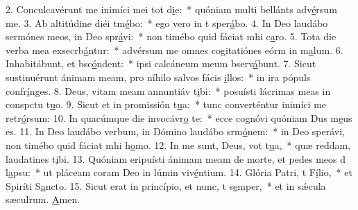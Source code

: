2. Conculcavérunt me inimíci mei tot d\uline{i}e:~* quóniam multi bellánts adv\uline{é}rsum me.
3. Ab altitúdine diéi tm\uline{é}bo:~* ego vero in t sper\uline{á}bo.
4. In Deo laudábo sermónes meos, in Deo spr\uline{á}vi:~* non timébo quid fáciat mhi c\uline{a}ro.
5. Tota die verba mea exsecrb\uline{á}ntur:~* advérsum me omnes cogitatiónes eórm in m\uline{a}lum.
6. Inhabitábunt, et bsc\uline{ó}ndent:~* ipsi calcáneum meum bserv\uline{á}bunt.
7. Sicut sustinuérunt ánimam meam, pro níhilo salvos fácis \uline{i}llos:~* in ira pópuls confr\uline{í}nges.
8. Deus, vitam meam annuntiáv t\uline{i}bi:~* posuísti lácrimas meas in conspctu t\uline{u}o.
9. Sicut et in promissión t\uline{u}a:~* tunc converténtur inimíci me retr\uline{ó}rsum:
10. In quacúmque die invocávr\uline{o} te:~* ecce cognóvi quóniam Dus m\uline{e}us es.
11. In Deo laudábo verbum, in Dómino laudábo srm\uline{ó}nem:~* in Deo sperávi, non timébo quid fáciat mhi h\uline{o}mo.
12. In me sunt, Deus, vot t\uline{u}a,~* quæ reddam, laudatines t\uline{i}bi.
13. Quóniam eripuísti ánimam meam de morte, et pedes meos d l\uline{a}psu:~* ut pláceam coram Deo in lúmin viv\uline{é}ntium.
14. Glória Patri, t F\uline{í}lio,~* et Spiríti S\uline{a}ncto.
15. Sicut erat in princípio, et nunc, t s\uline{e}mper,~* et in sǽcula sæculrum. \uline{A}men.
